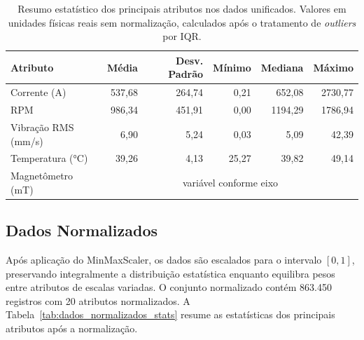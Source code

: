 \begin{table}[H]
  \centering
  \small
  \begin{tabular}{|l|r|r|r|r|r|}
    \hline
    \textbf{Atributo}   & \textbf{Média}                              & \textbf{Desv. Padrão} & \textbf{Mínimo} & \textbf{Mediana} & \textbf{Máximo} \\
    \hline
    Corrente (A)        & 537,68                                      & 264,74                & 0,21            & 652,08           & 2730,77         \\
    RPM                 & 986,34                                      & 451,91                & 0,00            & 1194,29          & 1786,94         \\
    Vibração RMS (mm/s) & 6,90                                        & 5,24                  & 0,03            & 5,09             & 42,39           \\
    Temperatura (°C)    & 39,26                                       & 4,13                  & 25,27           & 39,82            & 49,14           \\
    Magnetômetro (mT)   & \multicolumn{5}{c|}{variável conforme eixo}                                                                                \\
    \hline
  \end{tabular}
  \caption{Resumo estatístico dos principais atributos nos dados unificados. Valores em unidades físicas reais sem normalização, calculados após o tratamento de \textit{outliers} por IQR.}
  \label{tab:resumo_stats_unificados}
\end{table}

\subsection{Dados Normalizados}

Após aplicação do MinMaxScaler, os dados são escalados para o intervalo $[0, 1]$, preservando integralmente a distribuição estatística enquanto equilibra pesos entre atributos de escalas variadas. O conjunto normalizado contém 863.450 registros com 20 atributos normalizados. A Tabela~\ref{tab:dados_normalizados_stats} resume as estatísticas dos principais atributos após a normalização.


